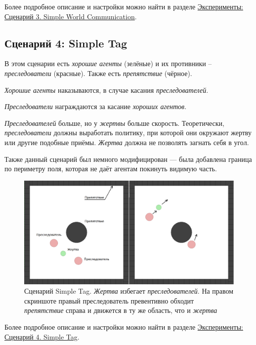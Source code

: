 Более подробное описание и настройки можно найти в разделе \hyperref[exp-swc]{Эксперименты: Сценарий 3. Simple World Communication}.

\subsection{Сценарий 4: Simple Tag} \label{intro-st}

В этом сценарии есть \textit{хорошие агенты} (зелёные) и их противники – \textit{преследователи} (красные). Также есть \textit{препятствие} (чёрное).

\textit{Хорошие агенты} наказываются, в случае касания \textit{преследователей}.

\textit{Преследователи} награждаются за касание \textit{хороших агентов}.

\textit{Преследователей} больше, но у \textit{жертвы} больше скорость. Теоретически, \textit{преследователи} должны выработать политику, при которой они окружают жертву или другие подобные приёмы. \textit{Жертва} должна не позволять загнать себя в угол.

Также данный сценарий был немного модифицирован --- была добавлена граница по периметру поля, которая не даёт агентам покинуть видимую часть.

\begin{figure}[ht!] 
	\center
	\includegraphics [scale=0.41] {my_folder/images/intro/st.png}
	\caption{Сценарий Simple Tag. \textit{Жертва} избегает \textit{преследователей}. На правом скриншоте правый преследователь превентивно обходит \textit{препятствие} справа и движется в ту же область, что и \textit{жертва}}
	\label{fig:st}  
\end{figure}

Более подробное описание и настройки можно найти в разделе \hyperref[exp-st]{Эксперименты: Сценарий 4. Simple Tag}.

